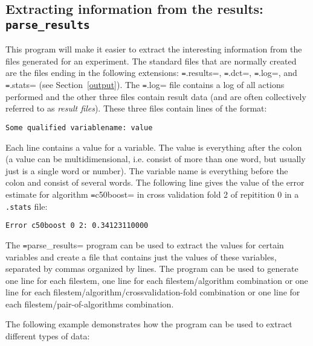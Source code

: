 \documentclass[a4paper,10pt,twoside]{article}
\begin{document}

\subsection{Extracting information from the results: \texttt{parse\_results}}

This program will make it easier to extract the interesting information
from the files generated for an experiment. The standard files 
that are normally created are the files ending in the following
extensions: \texttt=.results=, \texttt=.dct=, \texttt=.log=, and 
\texttt=.stats= (see Section~\ref{output}). The \texttt=.log= file
contains a log of all actions performed and the other three files
contain result data (and are often collectively referred to as
\emph{result files}). These three files contain lines of the format:

\begin{verbatim}
Some qualified variablename: value
\end{verbatim}

Each line contains a value for a variable. The value is everything
after the colon (a value can be multidimensional, i.e. consist of more
than one word, but usually just is a single word or number).
The variable name is everything before the colon and consist of
several words. The following line gives the value of the error estimate
for algorithm \texttt=c50boost= in cross validation fold 2 of repitition 0
in a \verb=.stats= file:

\begin{verbatim}
Error c50boost 0 2: 0.34123110000
\end{verbatim}

The \texttt=parse\_results= program can be used to extract the values for
certain variables and create a file that contains just the values
of these variables, separated by commas organized by lines.
The program can be used to generate one line for each filestem,
one line for each filestem/algorithm combination or one line
for each filestem/algorithm/crossvalidation-fold combination or 
one line for each filestem/pair-of-algorithms combination.

The following example demonstrates how the program can be used 
to extract different types of data:
\end{document}
